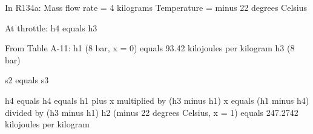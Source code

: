 In R134a:  
Mass flow rate = 4 kilograms  
Temperature = minus 22 degrees Celsius  

At throttle:  
h4 equals h3  

From Table A-11:  
h1 (8 bar, x = 0) equals 93.42 kilojoules per kilogram  
h3 (8 bar)  

s2 equals s3  

h4 equals h4 equals h1 plus x multiplied by (h3 minus h1)  
x equals (h1 minus h4) divided by (h3 minus h1)  
h2 (minus 22 degrees Celsius, x = 1) equals 247.2742 kilojoules per kilogram